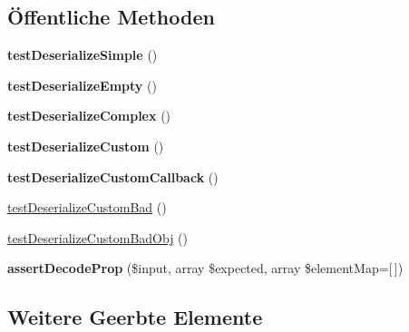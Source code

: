 \subsection*{Öffentliche Methoden}
\begin{DoxyCompactItemize}
\item 
\mbox{\label{class_sabre_1_1_d_a_v_1_1_xml_1_1_element_1_1_prop_test_a2a35cb1b2ca32bd0f559c4c7d1b2fdce}} 
{\bfseries test\+Deserialize\+Simple} ()
\item 
\mbox{\label{class_sabre_1_1_d_a_v_1_1_xml_1_1_element_1_1_prop_test_a9b4c5e55272150c69068fae9e19a7e91}} 
{\bfseries test\+Deserialize\+Empty} ()
\item 
\mbox{\label{class_sabre_1_1_d_a_v_1_1_xml_1_1_element_1_1_prop_test_a9a20b7f48213341b4f0c2fdc468b9403}} 
{\bfseries test\+Deserialize\+Complex} ()
\item 
\mbox{\label{class_sabre_1_1_d_a_v_1_1_xml_1_1_element_1_1_prop_test_a8ca36edf7ab0911875c58803e8c81378}} 
{\bfseries test\+Deserialize\+Custom} ()
\item 
\mbox{\label{class_sabre_1_1_d_a_v_1_1_xml_1_1_element_1_1_prop_test_a088985be32d10dc16bb6f788fce36282}} 
{\bfseries test\+Deserialize\+Custom\+Callback} ()
\item 
\mbox{\hyperlink{class_sabre_1_1_d_a_v_1_1_xml_1_1_element_1_1_prop_test_a975574d20bef5651fba3c74160d59de9}{test\+Deserialize\+Custom\+Bad}} ()
\item 
\mbox{\hyperlink{class_sabre_1_1_d_a_v_1_1_xml_1_1_element_1_1_prop_test_acd55c7abbf37e4a16160e43d8e0f2e6b}{test\+Deserialize\+Custom\+Bad\+Obj}} ()
\item 
\mbox{\label{class_sabre_1_1_d_a_v_1_1_xml_1_1_element_1_1_prop_test_a299f4902f4be43ff0b60c8f100904e0d}} 
{\bfseries assert\+Decode\+Prop} (\$input, array \$expected, array \$element\+Map=\mbox{[}$\,$\mbox{]})
\end{DoxyCompactItemize}
\subsection*{Weitere Geerbte Elemente}


